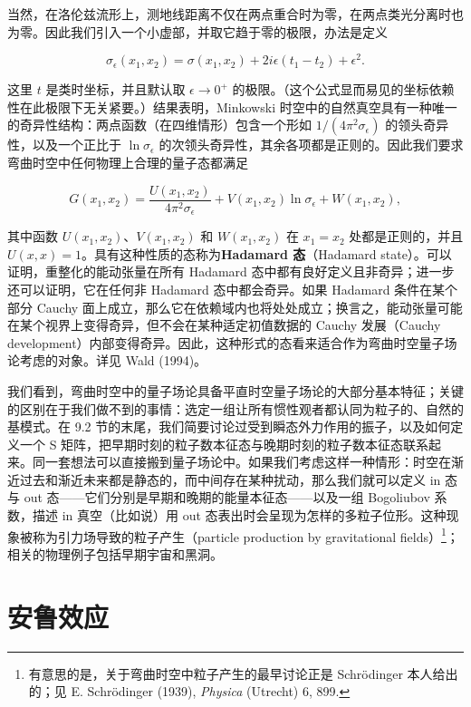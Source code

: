 当然，在洛伦兹流形上，测地线距离不仅在两点重合时为零，在两点类光分离时也为零。因此我们引入一个小虚部，并取它趋于零的极限，办法是定义

\begin{equation*}
\sigma_{\epsilon}(x_1, x_2) = \sigma(x_1, x_2) + 2i\epsilon(t_1 - t_2) + \epsilon^{2}.
\tag{9.122}
\end{equation*}

这里 $t$ 是类时坐标，并且默认取 $\epsilon \to 0^{+}$ 的极限。（这个公式显而易见的坐标依赖性在此极限下无关紧要。）结果表明，Minkowski 时空中的自然真空具有一种唯一的奇异性结构：两点函数（在四维情形）包含一个形如 $1/(4\pi^{2}\sigma_{\epsilon})$ 的领头奇异性，以及一个正比于 $\ln\sigma_{\epsilon}$ 的次领头奇异性，其余各项都是正则的。因此我们要求弯曲时空中任何物理上合理的量子态都满足

\begin{equation*}
G(x_1, x_2) = \frac{U(x_1, x_2)}{4\pi^{2}\sigma_{\epsilon}} + V(x_1, x_2)\ln\sigma_{\epsilon} + W(x_1, x_2),
\tag{9.123}
\end{equation*}

其中函数 $U(x_1,x_2)$、$V(x_1,x_2)$ 和 $W(x_1,x_2)$ 在 $x_1=x_2$ 处都是正则的，并且 $U(x,x)=1$。具有这种性质的态称为\textbf{Hadamard 态}（Hadamard state）。可以证明，重整化的能动张量在所有 Hadamard 态中都有良好定义且非奇异；进一步还可以证明，它在任何非 Hadamard 态中都会奇异。如果 Hadamard 条件在某个部分 Cauchy 面上成立，那么它在依赖域内也将处处成立；换言之，能动张量可能在某个视界上变得奇异，但不会在某种适定初值数据的 Cauchy 发展（Cauchy development）内部变得奇异。因此，这种形式的态看来适合作为弯曲时空量子场论考虑的对象。详见 Wald (1994)。

我们看到，弯曲时空中的量子场论具备平直时空量子场论的大部分基本特征；关键的区别在于我们做不到的事情：选定一组让所有惯性观者都认同为粒子的、自然的基模式。在 9.2 节的末尾，我们简要讨论过受到瞬态外力作用的振子，以及如何定义一个 S 矩阵，把早期时刻的粒子数本征态与晚期时刻的粒子数本征态联系起来。同一套想法可以直接搬到量子场论中。如果我们考虑这样一种情形：时空在渐近过去和渐近未来都是静态的，而中间存在某种扰动，那么我们就可以定义 in 态与 out 态——它们分别是早期和晚期的能量本征态——以及一组 Bogoliubov 系数，描述 in 真空（比如说）用 out 态表出时会呈现为怎样的多粒子位形。这种现象被称为引力场导致的粒子产生（particle production by gravitational fields）\footnote{有意思的是，关于弯曲时空中粒子产生的最早讨论正是 Schrödinger 本人给出的；见 E. Schrödinger (1939), \emph{Physica} (Utrecht) 6, 899.}；相关的物理例子包括早期宇宙和黑洞。

\section{安鲁效应}

